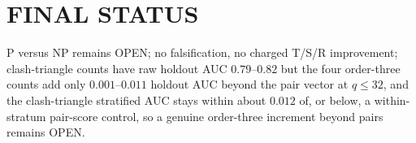 \documentclass[11pt]{article}
\begin{document}
\section*{FINAL STATUS}
P versus NP remains OPEN; no falsification, no charged T/S/R improvement; clash-triangle counts have raw holdout AUC $0.79$--$0.82$ but the four order-three counts add only $0.001$--$0.011$ holdout AUC beyond the pair vector at $q\le32$, and the clash-triangle stratified AUC stays within about $0.012$ of, or below, a within-stratum pair-score control, so a genuine order-three increment beyond pairs remains OPEN.
\end{document}
